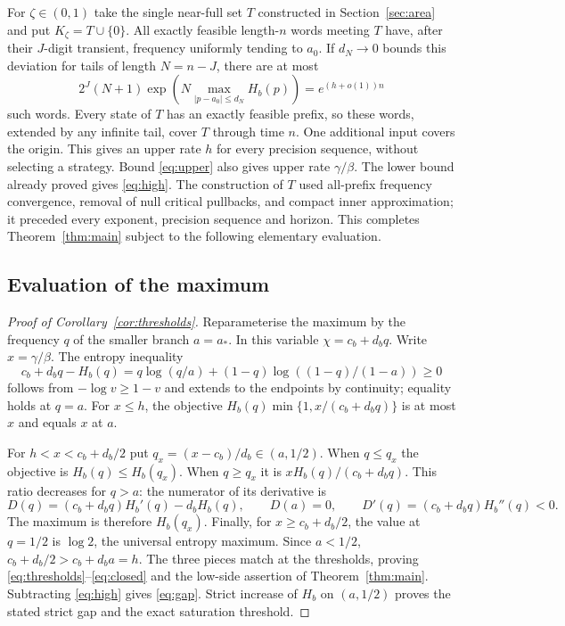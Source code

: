 \documentclass[11pt]{amsart}
\theoremstyle{definition}
\theoremstyle{remark}
\numberwithin{equation}{section}
\begin{document}
For $\zeta\in(0,1)$ take the single near-full set $T$ constructed
in Section~\ref{sec:area} and put $K_\zeta=T\cup\{0\}$.
All exactly feasible length-$n$ words meeting $T$ have,
after their $J$-digit transient, frequency uniformly tending to
$a_0$. If $d_N\to0$ bounds this deviation for tails of length
$N=n-J$, there are at most
\[
2^J(N+1)\exp\!\left(
N\max_{|p-a_0|\le d_N} H_b(p)\right)=e^{(h+o(1))n}
\]
such words. Every state of $T$ has an exactly feasible prefix,
so these words, extended by any infinite tail, cover $T$
through time $n$. One additional input covers the origin.
This gives an upper rate $h$ for every precision sequence,
without selecting a strategy. Bound \eqref{eq:upper} also
gives upper rate $\gamma/\beta$. The lower bound already proved
gives \eqref{eq:high}. The construction of $T$ used all-prefix frequency convergence,
removal of null critical pullbacks, and compact inner approximation;
it preceded every exponent, precision sequence and horizon.
This completes Theorem~\ref{thm:main} subject to the following
elementary evaluation.

\subsection{Evaluation of the maximum}
\begin{proof}[Proof of Corollary~\ref{cor:thresholds}]
Reparameterise the maximum by the frequency $q$ of the smaller
branch $a=a_*$. In this variable $\chi=c_b+d_bq$.
Write $x=\gamma/\beta$. The entropy inequality
\[
c_b+d_bq-H_b(q)=
q\log(q/a)+(1-q)\log((1-q)/(1-a))\ge0
\]
follows from $-\log v\ge1-v$ and extends to the endpoints
by continuity; equality holds at $q=a$.
For $x\le h$, the objective
$H_b(q)\min\{1,x/(c_b+d_bq)\}$ is at most $x$
and equals $x$ at $a$.

For $h<x<c_b+d_b/2$ put $q_x=(x-c_b)/d_b\in(a,1/2)$.
When $q\le q_x$ the objective is $H_b(q)\le H_b(q_x)$.
When $q\ge q_x$ it is $xH_b(q)/(c_b+d_bq)$.
This ratio decreases for $q>a$: the numerator of its
derivative is
\[
D(q)=(c_b+d_bq)H_b'(q)-d_bH_b(q),\qquad
D(a)=0,\qquad D'(q)=(c_b+d_bq)H_b''(q)<0.
\]
The maximum is therefore $H_b(q_x)$.
Finally, for $x\ge c_b+d_b/2$, the value at $q=1/2$ is
$\log2$, the universal entropy maximum.
Since $a<1/2$, $c_b+d_b/2>c_b+d_ba=h$.
The three pieces match at the thresholds, proving
\eqref{eq:thresholds}--\eqref{eq:closed} and the low-side assertion
of Theorem~\ref{thm:main}.
Subtracting \eqref{eq:high} gives \eqref{eq:gap}.
Strict increase of $H_b$ on $(a,1/2)$ proves the stated
strict gap and the exact saturation threshold.
\end{proof}
\end{document}
